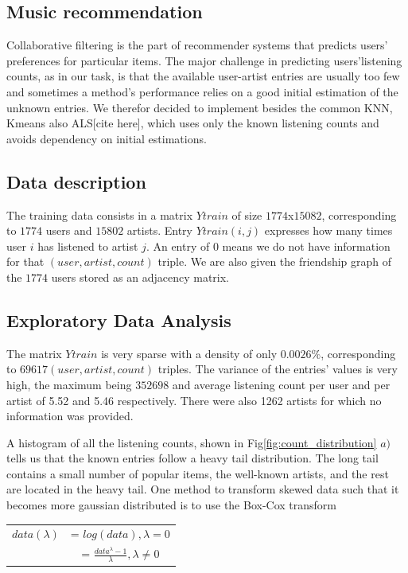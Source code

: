 \subsection{Music recommendation}
Collaborative filtering is the part of recommender systems that predicts users' preferences for particular items. The major challenge in predicting users'listening counts, as in our task, is that the available user-artist entries are usually too few and sometimes a method's performance relies on a good initial estimation of the unknown entries. 
We therefor decided to implement besides the common KNN, Kmeans also ALS[cite here], which uses only the known listening counts and avoids dependency on initial estimations.

\subsection{Data description}
The training data consists in a matrix $Ytrain$ of size $1774$x$15082$, corresponding to $1774$ users and $15802$ artists. Entry $Ytrain(i,j)$ expresses how many times user $i$ has listened to artist $j$. An entry of 0 means we do not have information for that $(user, artist, count)$ triple.
We are also given the friendship graph of the $1774$ users stored as an adjacency matrix.

\subsection{Exploratory Data Analysis}

The matrix $Ytrain$ is very sparse with a density of only $0.0026\%$, corresponding to 
$69617 (user, artist, count)$ triples. 
The variance of the entries' values is very high, the maximum  being $352698$ and average listening count per user and per artist of 5.52 and 5.46 respectively. There were also 1262 artists for which no information was provided.

A histogram of all the listening counts, shown in Fig\ref{fig:count_distribution} $a)$ tells us that the known entries follow a heavy tail distribution. The long tail contains a small number of popular items, the well-known artists, and the rest are located in the heavy tail.
One method to transform skewed data such that it becomes more gaussian distributed is to use the Box-Cox transform
\\
\begin{table}[h]
  \centering
  \begin{tabular}{c  c }
  $data(\lambda)$&= $log(data), \lambda = 0$ \\ 
                            &= $\frac{data^\lambda - 1}{\lambda} ,\lambda \neq 0$ \\ 
  \end{tabular}
\end{table}

